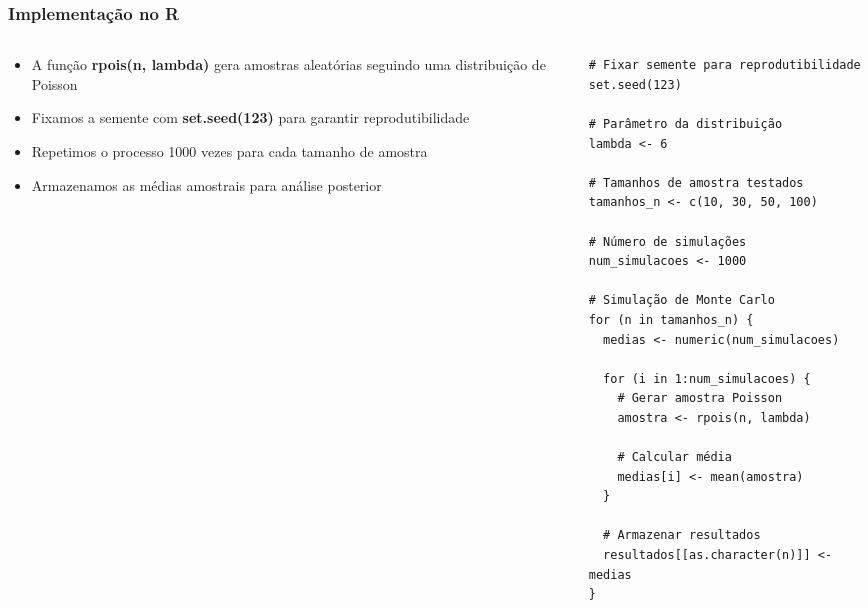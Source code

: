 \documentclass[aspectratio=169,12pt]{beamer}
\begin{document}
\begin{frame}[fragile]
    \frametitle{Implementação no R}
    
    \begin{columns}
        \begin{column}{0.5\textwidth}
            \begin{itemize}
                \item[\faIcon{code}] A função \textcolor{azulprincipal}{\textbf{rpois(n, lambda)}} gera amostras aleatórias seguindo uma distribuição de Poisson
                \vspace{0.3cm}
                
                \item[\faIcon{random}] Fixamos a semente com \textcolor{azulprincipal}{\textbf{set.seed(123)}} para garantir reprodutibilidade
                \vspace{0.3cm}
                
                \item[\faIcon{sync-alt}] Repetimos o processo 1000 vezes para cada tamanho de amostra
                \vspace{0.3cm}
                
                \item[\faIcon{chart-line}] Armazenamos as médias amostrais para análise posterior
            \end{itemize}
        \end{column}
        
        \begin{column}{0.5\textwidth}
            \begin{lstlisting}[basicstyle=\tiny\ttfamily]
# Fixar semente para reprodutibilidade
set.seed(123)

# Parâmetro da distribuição
lambda <- 6

# Tamanhos de amostra testados
tamanhos_n <- c(10, 30, 50, 100)

# Número de simulações
num_simulacoes <- 1000

# Simulação de Monte Carlo
for (n in tamanhos_n) {
  medias <- numeric(num_simulacoes)
  
  for (i in 1:num_simulacoes) {
    # Gerar amostra Poisson
    amostra <- rpois(n, lambda)
    
    # Calcular média
    medias[i] <- mean(amostra)
  }
  
  # Armazenar resultados
  resultados[[as.character(n)]] <- medias
}
            \end{lstlisting}
        \end{column}
    \end{columns}
\end{frame}
\end{document}
